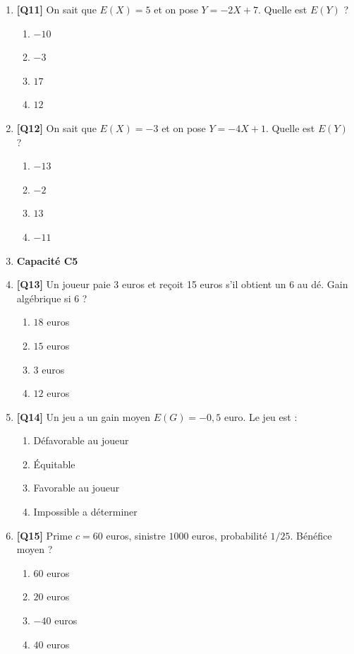 \begin{enumerate}
\item \textbf{[Q11]} On sait que $E(X)=5$ et on pose $Y=-2X+7$. Quelle est $E(Y)$ ?
  \begin{enumerate}[label=\Alph*.]
    \item $-10$
    \item $-3$
    \item $17$
    \item $12$
  \end{enumerate}

\item \textbf{[Q12]} On sait que $E(X)=-3$ et on pose $Y=-4X+1$. Quelle est $E(Y)$ ?
  \begin{enumerate}[label=\Alph*.]
    \item $-13$
    \item $-2$
    \item $13$
    \item $-11$
  \end{enumerate}

\item[] \textbf{Capacité C5}

\item \textbf{[Q13]} Un joueur paie 3 euros et reçoit 15 euros s'il obtient un 6 au dé. Gain algébrique si 6 ?
  \begin{enumerate}[label=\Alph*.]
    \item $18$ euros
    \item $15$ euros
    \item $3$ euros
    \item $12$ euros
  \end{enumerate}

\item \textbf{[Q14]} Un jeu a un gain moyen $E(G) = -0{,}5$ euro. Le jeu est :
  \begin{enumerate}[label=\Alph*.]
    \item Défavorable au joueur
    \item Équitable
    \item Favorable au joueur
    \item Impossible a déterminer
  \end{enumerate}

\item \textbf{[Q15]} Prime $c=60$ euros, sinistre $1000$ euros, probabilité $1/25$. Bénéfice moyen ?
  \begin{enumerate}[label=\Alph*.]
    \item $60$ euros
    \item $20$ euros
    \item $-40$ euros
    \item $40$ euros
  \end{enumerate}


\end{enumerate}
